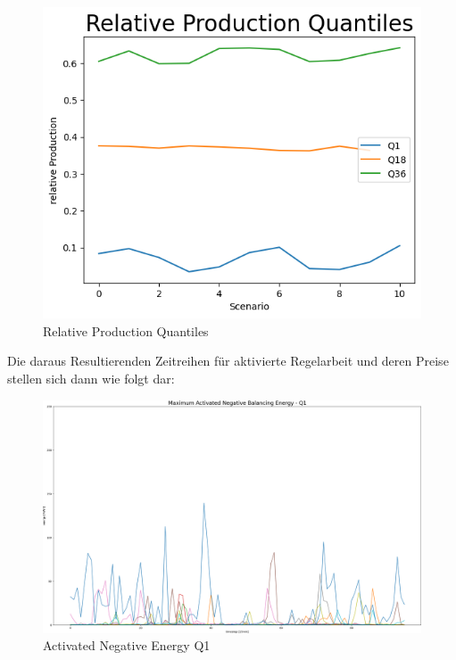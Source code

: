 \begin{figure}[!h]
	\includegraphics[width=0.7\linewidth]{pictures/results/relativeProduktionQuantils.png}
	\caption{Relative Production Quantiles}
	\label{fig:Relative Production Quantiles}
\end{figure}

Die daraus Resultierenden Zeitreihen für aktivierte Regelarbeit und deren Preise stellen sich dann wie folgt dar:
\begin{figure}[H]
	\centering

	\includegraphics[width=1\linewidth]{pictures/results/Activated_negEnergy_Q1.png}
	\caption{Activated Negative Energy Q1}
	\label{fig:_negEnergy_Q1}
\end{figure}


